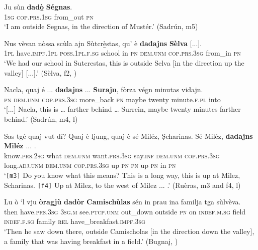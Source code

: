 \ea
\label{ex:dad2}
\gll Ju sùn \textbf{dadò̱} \textbf{Ségnas}.\\
\textsc{1sg} \textsc{cop.prs.1sg} from\_out \textsc{pn}\\
\glt `I am outside Segnas, in the direction of Mustér.' (Sadrún, m5)
\z

\ea
\label{ex:dad3}
\gll Nus vèvan nòssa scùla ajn Sùtcrè̱stas, qu’ è \textbf{dadajns} \textbf{Sèlva} [...]. \\
\textsc{1pl} have.\textsc{impf.1pl} \textsc{poss.1pl.f.sg} school in \textsc{pn} \textsc{dem.unm} \textsc{cop.prs.3sg} from\_in \textsc{pn}\\
\glt `We had our school in Sutcrestas, this is outside Selva [in the direction up the valley] [...].' (Sèlva, f2, )
\z

\ea
\label{ex:dad4}
\gll [...] Nacla, quaj é ... \textbf{dadajns} ... \textbf{Surajn}, fòrza végn minutas vidajn.\\
{} \textsc{pn} \textsc{dem.unm} \textsc{cop.prs.3sg} {} more\_back {} \textsc{pn} maybe twenty minute.\textsc{f.pl} into\\
\glt `[...] Nacla, this is … farther behind … Surrein, maybe twenty minutes farther behind.' (Sadrún, m4, l)
\z

\ea
\label{ex:dad5}
\gll {}\cb {} Sas tgé quaj vut dí? Quaj è ljung, quaj è sé Miléz, Ṣcharinas. \cb {} Sé Miléz, \textbf{dadajns} \textbf{Miléz} ... . \\ 
{} know.\textsc{prs.2sg} what \textsc{dem.unm} want.\textsc{prs.3sg} say.\textsc{inf} \textsc{dem.unm} \textsc{cop.prs.3sg} long.\textsc{adj.unm} \textsc{dem.unm} \textsc{cop.prs.3sg} up \textsc{pn} \textsc{pn} {} up \textsc{pn} in \textsc{pn}\\
\glt  `\texttt{[m3]} Do you know what this means? This is a long way, this is up at Milez, Scharinas. \texttt{[f4]} Up at Milez, to the west of Milez ... .' (Ruèras, m3 and f4, l)
\z

\ea
\label{ex:dad6}
\gll Lu ò ‘l vju \textbf{òragjù} \textbf{dadòr} \textbf{Camischùlas} sén in prau ina familja tga sùlvèva.\\
then have.\textsc{prs.3sg} \textsc{3sg.m} see.\textsc{ptcp.unm} out\_down outside \textsc{pn} on \textsc{indef.m.sg} field \textsc{indef.f.sg} family \textsc{rel} have\_breakfast.\textsc{impf.3sg}\\
\glt `Then he saw down there, outside Camischolas [in the direction down the valley], a family that was having breakfast in a field.' (Bugnaj, \citealt[139]{Büchli1966})
\z

